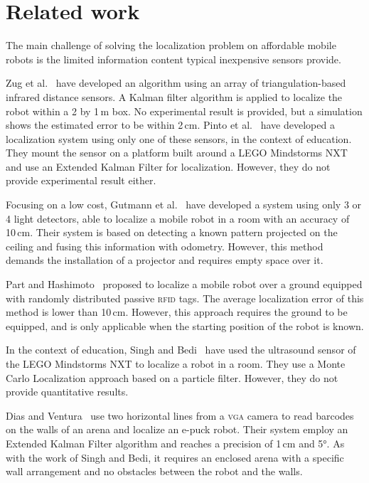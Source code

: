 \documentclass[letterpaper, 10pt, conference]{ieeeconf}
\begin{document}
\section{Related work}

The main challenge of solving the localization problem on affordable mobile robots is the limited information content typical inexpensive sensors provide.

Zug et al.~\cite{zug2011design} have developed an algorithm using an array of triangulation-based infrared distance sensors.
A Kalman filter algorithm is applied to localize the robot within a 2 by 1\,m box.
No experimental result is provided, but a simulation shows the estimated error to be within 2\,cm.
Pinto et al.~\cite{pinto2012localization} have developed a localization system using only one of these sensors, in the context of education.
They mount the sensor on a platform built around a LEGO Mindstorms NXT and use an Extended Kalman Filter for localization.
However, they do not provide experimental result either.

Focusing on a low cost, Gutmann et al.~\cite{gutmann2013challenges} have developed a system using only 3 or 4 light detectors, able to localize a mobile robot in a room with an accuracy of 10\,cm.
Their system is based on detecting a known pattern projected on the ceiling and fusing this information with odometry.
However, this method demands the installation of a projector and requires empty space over it.

Part and Hashimoto~\cite{park2009approach} proposed to localize a mobile robot over a ground equipped with randomly distributed passive \textsc{rfid} tags.
The average localization error of this method is lower than 10\,cm.
However, this approach requires the ground to be equipped, and is only applicable when the starting position of the robot is known.

In the context of education, Singh and Bedi~\cite{singh2013map} have used the ultrasound sensor of the LEGO Mindstorms NXT to localize a robot in a room.
They use a Monte Carlo Localization approach based on a particle filter.
However, they do not provide quantitative results.

Dias and Ventura~\cite{dias2013absolute} use two horizontal lines from a \textsc{vga} camera to read barcodes on the walls of an arena and localize an e-puck robot.
Their system employ an Extended Kalman Filter algorithm and reaches a precision of 1\,cm and 5°.
As with the work of Singh and Bedi, it requires an enclosed arena with a specific wall arrangement and no obstacles between the robot and the walls.
\end{document}

